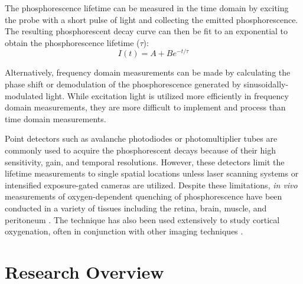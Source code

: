 The phosphorescence lifetime can be measured in the time domain by exciting the probe with a short pulse of light and collecting the emitted phosphorescence. The resulting phosphorescent decay curve can then be fit to an exponential to obtain the phosphorescence lifetime ($\tau$):
%
\begin{equation}
    \label{eq:exponential_decay}
    I(t) = A + Be^{-t / \tau}
\end{equation}

Alternatively, frequency domain measurements can be made by calculating the phase shift or demodulation of the phosphorescence generated by sinusoidally-modulated light. While excitation light is utilized more efficiently in frequency domain measurements, they are more difficult to implement and process than time domain measurements.

Point detectors such as avalanche photodiodes or photomultiplier tubes are commonly used to acquire the phosphorescent decays because of their high sensitivity, gain, and temporal resolutions. However, these detectors limit the lifetime measurements to single spatial locations unless laser scanning systems \cite{Yaseen:2009ep, Kazmi:2013ey} or intensified exposure-gated cameras \cite{Shonat:2003ia, Sakadzic:2009jo} are utilized. Despite these limitations, \textit{in vivo} measurements of oxygen-dependent quenching of phosphorescence have been conducted in a variety of tissues including the retina, brain, muscle, and peritoneum \cite{Vovenko:1999be}. The technique has also been used extensively to study cortical oxygenation, often in conjunction with other imaging techniques \cite{Yu:2013fd, Devor:2014ke}.



\section{Research Overview}

